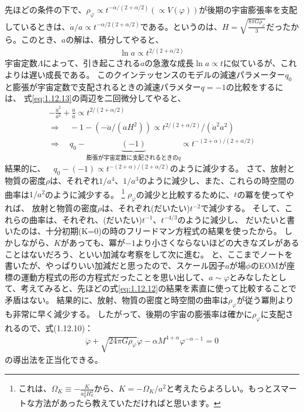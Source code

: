 \documentclass[11pt]{ltjsarticle}
\theoremstyle{plain}
\theoremstyle{break}
\begin{document}
先ほどの条件の下で、$\rho_{\varphi} \propto t^{-\alpha /(2+\alpha / 2)} (\propto V(\varphi))$が後期の宇宙膨張率を支配しているときは、$\dot{a} / a \propto t^{-\alpha / 2(2+\alpha / 2)}$である。というのは、$H = \sqrt{\frac{8\pi G \rho_{\varphi}}{3}}$だったから。このとき、$a$の解は、積分してやると、
\begin{align}
  \ln a \propto t^{2 /(2+\alpha / 2)}  \label{eq:1.12.13}
\end{align}%
宇宙定数$\Lambda$によって、引き起こされる$a$の急激な成長$\ln a \propto t$に似ているが、これよりは遅い成長である。
このクインテッセンスのモデルの減速パラメーター$q_0$と膨張が宇宙定数で支配されるときの減速パラメター$q = -1$の比較をするには、
式\eqref{eq:1.12.13}の両辺を二回微分してやると、
\begin{align}
  -\frac{\dot{a}^2}{a^2} + \frac{\ddot{a}}{a} \propto t^{2/(2+\alpha/2)}\\
  \Rightarrow \quad -1 -(- \ddot{a}/(a H^2)) \propto t^{2/(2+\alpha/2)}/(\dot{a}^2 a^2 )\\
  \Rightarrow \quad  q_0 -  \underbrace{(-1)}_{膨張が宇宙定数に支配されるときのq} \propto t^{-(2+\alpha) /(2+\alpha / 2)}
\end{align}%
結果的に、$\quad  q_0 -  (-1)\propto t^{-(2+\alpha) /(2+\alpha / 2)}$のように減少する。
さて、放射と物質の密度$\rho$は、それぞれ$1 / a^{4} 、1 / a^{3}$のように減少し、また、これらの時空間の曲率は$1 / a^{2}$のように減少する。
\footnote{これは、$\Omega_K \equiv -\frac{K}{a_0^2 H_0^2}$から、$K = -\Omega_K /a^2$と考えたらよろしい。もっとスマートな方法があったら教えていただければと思います。}
$\rho_\varphi$の減少と比較するために、$t$の冪を使ってやれば、
放射と物質の密度$\rho$は、それぞれ(だいたい)$t^{-2}$で減少する。
そして、これらの曲率は、それぞれ、(だいたい)$t^{-1}、t^{-4/3}$のように減少し、
だいたいと書いたのは、十分初期(K=0)の時のフリードマン方程式の結果を使ったから。
しかしながら、$K$があっても、冪が$-1$より小さくならないほどの大きなズレがあることはないだろう、といい加減な考察をして次に進む。
と、ここまでノートを書いたが、やっぱりいい加減だと思ったので、スケール因子$a$が場$\phi$のEOMが座標の運動方程式の形の方程式だったことを思い出して、$a \sim \varphi$とみなしたとして、考えてみると、先ほどの式\eqref{eq:1.12.12}の結果を素直に使って比較することで矛盾はない。
結果的に、放射、物質の密度と時空間の曲率は$\rho_{\varphi}$が従う冪則よりも非常に早く減少する。
したがって、後期の宇宙の膨張率は確かに$\rho_{\varphi}$に支配されるので、式(1.12.10)：
\begin{align}
  \ddot{\varphi}+\sqrt{24 \pi G \rho_{\varphi}} \dot{\varphi}-\alpha M^{4+\alpha} \varphi^{-\alpha-1}=0
\end{align}%
の導出法を正当化できる。
\end{document}
